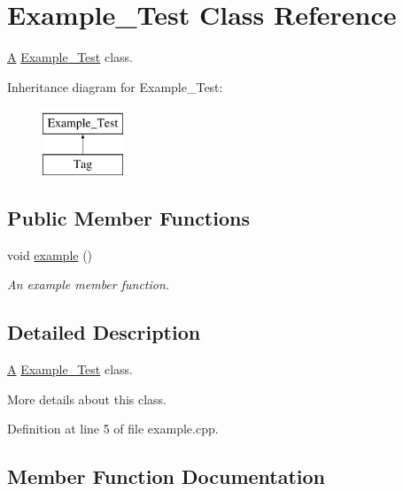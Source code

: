 \hypertarget{class_example___test}{}\section{Example\+\_\+\+Test Class Reference}
\label{class_example___test}


\mbox{\hyperlink{class_a}{A}} \mbox{\hyperlink{class_example___test}{Example\+\_\+\+Test}} class.  


Inheritance diagram for Example\+\_\+\+Test\+:\begin{figure}[H]
\begin{center}
\leavevmode
\includegraphics[height=2.000000cm]{class_example___test}
\end{center}
\end{figure}
\subsection*{Public Member Functions}
\begin{DoxyCompactItemize}
\item 
void \mbox{\hyperlink{class_example___test_a22a62b12c65fd5e43b6eadaabb21ebb0}{example}} ()
\begin{DoxyCompactList}\small\item\em An example member function. \end{DoxyCompactList}\end{DoxyCompactItemize}


\subsection{Detailed Description}
\mbox{\hyperlink{class_a}{A}} \mbox{\hyperlink{class_example___test}{Example\+\_\+\+Test}} class. 

More details about this class. 

Definition at line 5 of file example.\+cpp.



\subsection{Member Function Documentation}
\mbox{\label{class_example___test_a22a62b12c65fd5e43b6eadaabb21ebb0}} 

